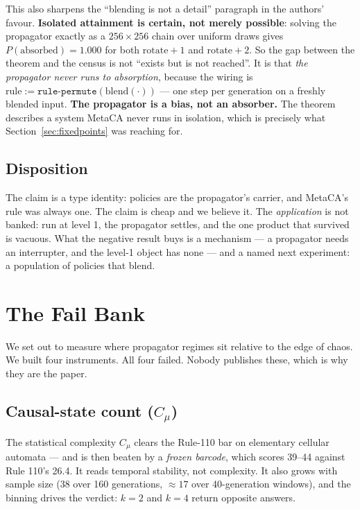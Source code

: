 \documentclass[man,12pt,floatsintext]{apa7}
\begin{document}
This also sharpens the ``blending is not a detail'' paragraph in the authors'
favour. \textbf{Isolated attainment is certain, not merely possible}: solving the
propagator exactly as a $256 \times 256$ chain over uniform draws gives
$P(\text{absorbed}) = 1.000$ for both $\mathrm{rotate}{+}1$ and
$\mathrm{rotate}{+}2$. So the gap between the theorem and the census is not
``exists but is not reached''. It is that \emph{the propagator never runs to
absorption}, because the wiring is
$\mathrm{rule} := \texttt{rule-permute}(\mathrm{blend}(\cdot))$ --- one step per
generation on a freshly blended input. \textbf{The propagator is a bias, not an
absorber.} The theorem describes a system MetaCA never runs in isolation, which is
precisely what Section~\ref{sec:fixedpoints} was reaching for.

\subsection{Disposition}

The claim is a type identity: policies are the propagator's carrier, and MetaCA's
rule was always one. The claim is cheap and we believe it. The \emph{application}
is not banked: run at level 1, the propagator settles, and the one product that
survived is vacuous. What the negative result buys is a mechanism --- a propagator
needs an interrupter, and the level-1 object has none --- and a named next
experiment: a population of policies that blend.

\section{The Fail Bank}
\label{sec:failbank}

We set out to measure where propagator regimes sit relative to the edge of
chaos. We built four instruments. All four failed. Nobody publishes these,
which is why they are the paper.

\subsection{Causal-state count ($C_\mu$)}

The statistical complexity $C_\mu$ \parencite{crutchfield1989inferring,
shalizi2001computational} clears the Rule-110 bar on elementary cellular
automata --- and is then beaten by a \emph{frozen barcode}, which scores
39--44 against Rule 110's 26.4. It reads temporal stability, not
complexity. It also grows with sample size (38 over 160 generations,
$\approx 17$ over 40-generation windows), and the binning drives the
verdict: $k=2$ and $k=4$ return opposite answers.
\end{document}
